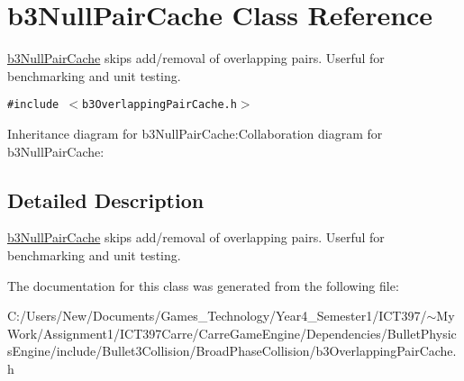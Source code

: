 \hypertarget{classb3_null_pair_cache}{
\section{b3NullPairCache Class Reference}
\label{classb3_null_pair_cache}
}
\hyperlink{classb3_null_pair_cache}{b3NullPairCache} skips add/removal of overlapping pairs. Userful for benchmarking and unit testing.  


{\tt \#include $<$b3OverlappingPairCache.h$>$}

Inheritance diagram for b3NullPairCache:Collaboration diagram for b3NullPairCache:

\subsection{Detailed Description}
\hyperlink{classb3_null_pair_cache}{b3NullPairCache} skips add/removal of overlapping pairs. Userful for benchmarking and unit testing. 

The documentation for this class was generated from the following file:\begin{CompactItemize}
\item 
C:/Users/New/Documents/Games\_\-Technology/Year4\_\-Semester1/ICT397/$\sim$My Work/Assignment1/ICT397Carre/CarreGameEngine/Dependencies/BulletPhysicsEngine/include/Bullet3Collision/BroadPhaseCollision/b3OverlappingPairCache.h\end{CompactItemize}
